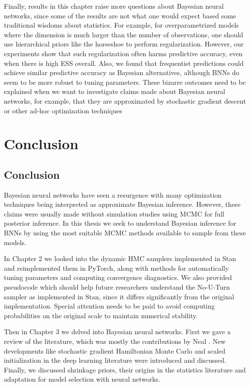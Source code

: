 \documentclass[12pt]{report}
\begin{document}
Finally, results in this chapter raise more questions about Bayesian neural networks, since some of the results are not what one would expect based some traditional wisdoms about statistics. For example, for overparametrized models where the dimension is much larger than the number of observations, one should use hierarchical priors like the horseshoe to perform regularization. However, our experiments show that such regularization often harms predictive accuracy, even when there is high ESS overall. Also, we found that frequentist predictions could achieve similar predictive accuracy as Bayesian alternatives, although BNNs do seem to be more robust to tuning parameters. These bizarre outcomes need to be explained when we want to investigate claims made about Bayesian neural networks, for example, that they are approximated by stochastic gradient descent \cite{mandt2017stochastic} or other ad-hoc optimization techniques \cite{gal2015dropout,gal2015bayesian}



\chapter{Conclusion}
\section{Conclusion}

	Bayesian neural networks have seen a resurgence with many optimization techniques being interpreted as approximate Bayesian inference. However, these claims were usually made without simulation studies using MCMC for full posterior inference. In this thesis we seek to understand Bayesian inference for BNNs by using the most suitable MCMC methods available to sample from these models. 


In Chapter 2 we looked into the dynamic HMC samplers implemented in Stan and reimplemented them in PyTorch, along with methods for automatically tuning parameters and computing convergence diagnostics. We also provided pseudocode which should help future researchers understand the No-U-Turn sampler as implemented in Stan, since it differs significantly from the original implementation. Special attention needs to be paid to avoid computing probabilities on the original scale to maintain numerical stability.

Then in Chapter 3 we delved into Bayesian neural networks. First we gave a review of the literature, which was mostly the contributions by Neal \cite{neal2012bayesian}. New developments like stochastic gradient Hamiltonian Monte Carlo and scaled initialization in the deep learning literature \cite{chen2014stochastic,bengio1994learning} were introduced and discussed. Finally, we discussed shrinkage priors, their origins in the statistics literature and adaptation for model selection with neural networks. 
\end{document}
